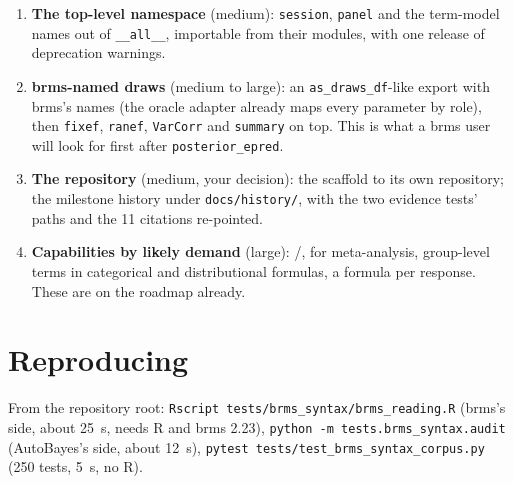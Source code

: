 \documentclass[11pt]{article}
\newcommand{\code}[1]{\texttt{#1}}
\newcommand{\file}[1]{\texttt{#1}}
\newcommand{\f}[1]{\texttt{\detokenize{#1}}}
\newcommand{\allname}{\_\_all\_\_}
\begin{document}
\begin{enumerate}
its treatment coding, priors that are never broadcast, refused missing values, \code{fit()}'s \code{draws}/\code{tune} and
\code{target\_accept = 0.9}, the posterior's names.
\item \textbf{The top-level namespace} (medium): \code{session}, \code{panel} and the term-model names out of
\code{\allname}, importable from their modules, with one release of deprecation warnings.
\item \textbf{brms-named draws} (medium to large): an \code{as\_draws\_df}-like export with brms's names (the oracle
adapter already maps every parameter by role), then \code{fixef}, \code{ranef}, \code{VarCorr} and \code{summary} on top.
This is what a brms user will look for first after \code{posterior\_epred}.
\item \textbf{The repository} (medium, your decision): the scaffold to its own repository; the milestone history under
\file{docs/history/}, with the two evidence tests' paths and the 11 citations re-pointed.
\item \textbf{Capabilities by likely demand} (large): \f{s()}/\f{t2()}, \f{se()} for meta-analysis, group-level terms in
categorical and distributional formulas, a formula per response. These are on the roadmap already.
\end{enumerate}

\section*{Reproducing}

\noindent From the repository root: \code{Rscript tests/brms\_syntax/brms\_reading.R} (brms's side, about 25~s, needs R and brms
2.23), \code{python -m tests.brms\_syntax.audit} (AutoBayes's side, about 12~s), \code{pytest
tests/test\_brms\_syntax\_corpus.py} (250 tests, 5~s, no R).
\end{document}
